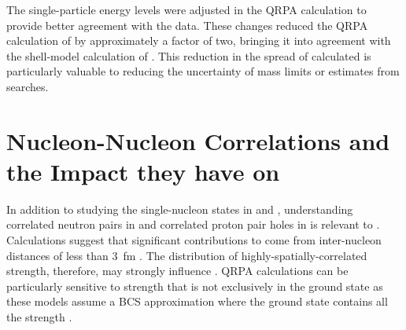 The single-particle energy levels were adjusted in the QRPA calculation \citep{SuhonenEnergyAdjust} to provide better agreement with the data.  These changes reduced the QRPA calculation of \NME by approximately a factor of two, bringing it into agreement with the shell-model calculation of \NME.  This reduction in the spread of calculated \NME is particularly valuable to reducing the uncertainty of mass limits or estimates from \zvbb searches. 

\section{Nucleon-Nucleon Correlations and the Impact they have on \NME}
\label{sec:correlations}

In addition to studying the single-nucleon states in \GeTargets and \SeProducts, understanding correlated neutron pairs in  and correlated proton pair holes in  is relevant to \NME.  Calculations suggest that significant contributions to \NME come from inter-nucleon distances of less than 3~fm \citep{anatomy}.  The distribution of highly-spatially-correlated \zp strength, therefore, may strongly influence \NME.  QRPA calculations can be particularly sensitive to \zp strength that is not exclusively in the ground state as these models assume a BCS approximation where the ground state contains all the \zp strength \citep{BenderSCMF}. 
